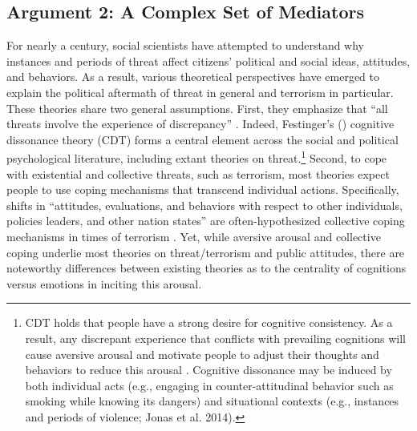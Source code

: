 \subsection{Argument 2: A Complex Set of Mediators }
\label{sec:122}
For nearly a century, social scientists have attempted to understand why instances and periods of threat affect citizens' political and social ideas, attitudes, and behaviors. As a result, various theoretical perspectives have emerged to explain the political aftermath of threat in general and terrorism in particular.  These theories share two general assumptions. First, they emphasize that ``all threats involve the experience of discrepancy'' \citep[][p. 221]{Jonas2014}. Indeed, Festinger's (\citeyear{Festinger1975}) cognitive dissonance theory (CDT) forms a central element across the social and political psychological literature, including extant theories on threat.\footnote{CDT holds that people have a strong desire for cognitive consistency. As a result, any discrepant experience that conflicts with prevailing cognitions will cause aversive arousal and motivate people to adjust their thoughts and behaviors to reduce this arousal \citep{Jonas2014}. Cognitive dissonance may be induced by both individual acts (e.g., engaging in counter-attitudinal behavior such as smoking while knowing its dangers) and situational contexts (e.g., instances and periods of violence; Jonas et al. 2014).} Second, to cope with existential and collective threats, such as terrorism, most theories expect people to use coping mechanisms that transcend individual actions. Specifically, shifts in ``attitudes, evaluations, and behaviors with respect to other individuals, policies leaders, and other nation states'' are often-hypothesized collective coping mechanisms in times of terrorism \citep[][p. 10]{Merolla2009a}. Yet, while aversive arousal and collective coping underlie most theories on threat/terrorism and public attitudes, there are noteworthy differences between existing theories as to the centrality of cognitions versus emotions in inciting this arousal. 


